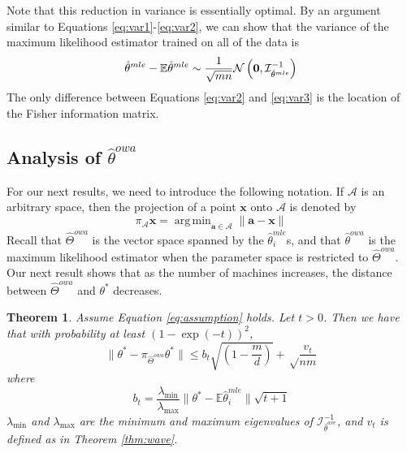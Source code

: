\documentclass[twoside]{article}
\newtheorem{theorem}{Theorem}
\DeclareMathOperator*{\argmin}{arg\,min}
\newcommand{\zero}{\text{\textbf{0}}}
\newcommand{\W}{{\hat \Theta^{\textit{owa}}}}
\newcommand{\Wowa}{{\hat \Theta^{\textit{owa}}}}
\newcommand{\A}{\mathcal{A}}
\newcommand{\E}{\mathbb{E}}
\newcommand{\x}{\mathbf{x}}
\newcommand{\w}{\theta}
\newcommand{\wowa}{\hat\w^{owa}}
\newcommand{\wave}{\hat\w^{ave}}
\newcommand{\wmle}{\hat\w^{mle}}
\newcommand{\wstar}{{\w^{*}}}
\newcommand{\tbias}{t_{\text{\textit{bias}}}}
\newcommand{\I}{\mathcal I}
\newcommand{\normal}[2]{\ensuremath{\mathcal{N}\left({{#1}},{{#2}}\right)}}
\newcommand{\ltwo}[1]{{\lVert {#1} \rVert}}
\newcommand{\lzero}[1]{{\lVert {#1} \rVert}_0}
\newcommand{\proj}[1]{\pi_{{#1}}}
\begin{document}
Note that this reduction in variance is essentially optimal.
By an argument similar to Equations \ref{eq:var1}-\ref{eq:var2},
we can show that the variance of the maximum likelihood estimator trained on all of the data is
\begin{equation}
\wmle - \E\wmle \sim \frac{1}{\sqrt{mn}} \normal{\zero}{\I^{-1}_{\wmle}}
\label{eq:var3}
\end{equation}
The only difference between Equations \ref{eq:var2} and \ref{eq:var3} is the location of the Fisher information matrix.

\subsection {Analysis of $\wowa$}

For our next results, we need to introduce the following notation.
If $\A$ is an arbitrary space,
then the projection of a point $\x$ onto $\A$ is denoted by
\begin{equation}
\proj{\A}\x = \argmin_{\mathbf{a}\in\A} \ltwo{\mathbf{a}-\x}
\end{equation}
Recall that $\W$ is the vector space spanned by the $\wmle_i$s,
and that $\wowa$ is the maximum likelihood estimator when the parameter space is restricted to $\W$.
Our next result shows that as the number of machines increases,
the distance between $\W$ and $\wstar$ decreases.

\begin{theorem}
Assume Equation \ref{eq:assumption} holds.
Let $t>0$.
Then we have that with probability at least $(1-\exp(-t))^2$,
\begin{equation}
\ltwo{\wstar-\proj\W\wstar}
\le
b_t\sqrt{\left(1-\frac{m}{d}\right)}
+
\sqrt\frac{v_{t}}{nm}
\end{equation}
where
\begin{equation}
b_t = \frac{\lambda_{\min}}{\lambda_{\max}}\ltwo{\wstar-\E\wmle_i}\sqrt{t + 1}
\end{equation}
$\lambda_{\min}$ and $\lambda_{\max}$ are the minimum and maximum eigenvalues of $\I^{-1}_{\wave}$,
and $v_t$ is defined as in Theorem \ref{thm:wave}.
\end{theorem}
\end{document}

